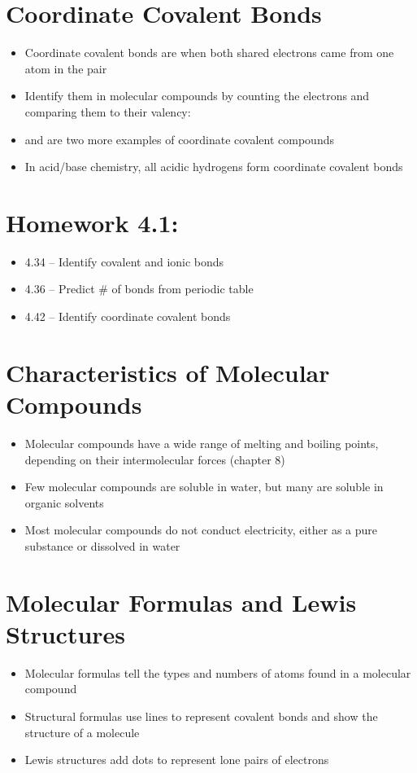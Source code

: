 \documentclass[12pt, openany, letterpaper]{memoir}
\begin{document}
\section{Coordinate Covalent Bonds}
\begin{itemize}
	\item Coordinate covalent bonds are when both shared electrons came from one atom in the pair
	\item Identify them in molecular compounds by counting the electrons and comparing them to their valency: 
	\item {} and  are two more examples of coordinate covalent compounds
	\item In acid/base chemistry, all acidic hydrogens form coordinate covalent bonds
\end{itemize}

\section*{Homework 4.1:}
\begin{itemize}
	\item 4.34 -- Identify covalent and ionic bonds
	\item 4.36 -- Predict \# of bonds from periodic table
	\item 4.42 -- Identify coordinate covalent bonds
\end{itemize}

\section{Characteristics of Molecular Compounds}
\begin{itemize}
	\item Molecular compounds have a wide range of melting and boiling points, depending on their intermolecular forces (chapter 8)
	\item Few molecular compounds are soluble in water, but many are soluble in organic solvents
	\item Most molecular compounds do not conduct electricity, either as a pure substance or dissolved in water
\end{itemize}

\section{Molecular Formulas and Lewis Structures}
\begin{itemize}
	\item Molecular formulas tell the types and numbers of atoms found in a molecular compound
	\item Structural formulas use lines to represent covalent bonds and show the structure of a molecule
	\item Lewis structures add dots to represent lone pairs of electrons
\end{itemize}
\end{document}

